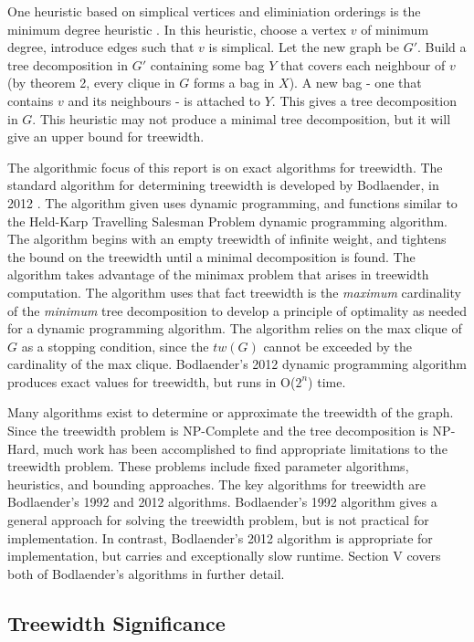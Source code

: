 \documentclass[12pt,conference]{IEEEtran}
\theoremstyle{plain}
\begin{document}
One heuristic based on simplical vertices and eliminiation orderings is the minimum degree heuristic \cite{min-degree-upper-bound}. In this heuristic, choose a vertex $v$ of minimum degree, introduce edges such that $v$ is simplical. Let the new graph be $G'$. Build a tree decomposition in $G'$ containing some bag $Y$ that covers each neighbour of $v$ (by theorem 2, every clique in $G$ forms a bag in $X$). A new bag - one that contains $v$ and its neighbours - is attached to $Y$. This gives a tree decomposition in $G$. This heuristic may not produce a minimal tree decomposition, but it will give an upper bound for treewidth.

The algorithmic focus of this report is on exact algorithms for treewidth. The standard algorithm for determining treewidth is developed by Bodlaender, in 2012 \cite{bodlaender-2012}. The algorithm given uses dynamic programming, and functions similar to the Held-Karp Travelling Salesman Problem dynamic programming algorithm. The algorithm begins with an empty treewidth of infinite weight, and tightens the bound on the treewidth until a minimal decomposition is found. The algorithm takes advantage of the minimax problem that arises in treewidth computation. The algorithm uses that fact treewidth is the \textit{maximum} cardinality of the \textit{minimum} tree decomposition to develop a principle of optimality as needed for a dynamic programming algorithm. The algorithm relies on the max clique of $G$ as a stopping condition, since the $tw(G)$ cannot be exceeded by the cardinality of the max clique. Bodlaender's 2012 dynamic programming algorithm produces exact values for treewidth, but runs in O($2^{n}$) time.

Many algorithms exist to determine or approximate the treewidth of the graph. Since the treewidth problem is NP-Complete and the tree decomposition is NP-Hard, much work has been accomplished to find appropriate limitations to the treewidth problem. These problems include fixed parameter algorithms, heuristics, and bounding approaches. The key algorithms for treewidth are Bodlaender's 1992 and 2012 algorithms. Bodlaender's 1992 algorithm gives a general approach for solving the treewidth problem, but is not practical for implementation. In contrast, Bodlaender's 2012 algorithm is appropriate for implementation, but carries and exceptionally slow runtime. Section V covers both of Bodlaender's algorithms in further detail.

\subsection{Treewidth Significance}
\end{document}
